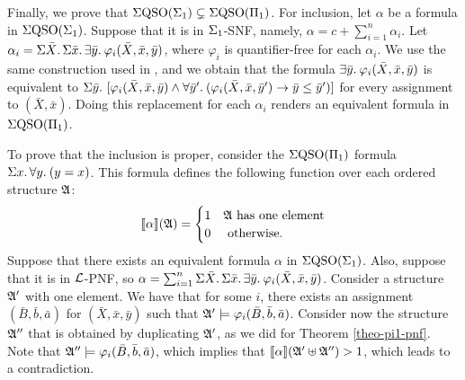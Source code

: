 Finally, we prove that $\Sigma{\rm QSO}(\Sigma_{1})\subsetneq\Sigma{\rm QSO}(\Pi_{1})$. 
For inclusion, let $\alpha$ be a formula in $\Sigma{\rm QSO}(\Sigma_{1})$. 
Suppose that it is in $\Sigma_{1}$-SNF, namely, $\alpha = c + \sum_{i = 1}^{n}\alpha_i$. 
Let $\alpha_i = \Sigma{\bar{X}}.\,\Sigma{\bar{x}}.\,\exists{\bar{y}}.\:\varphi_i(\bar{X},\bar{x},\bar{y})$, where $\varphi_i$ is quantifier-free for each $\alpha_i$. 
We use the same construction used in \cite{SalujaST95}, and we obtain that the formula $\exists{\bar{y}}.\:\varphi_i(\bar{X},\bar{x},\bar{y})$ is equivalent to $\Sigma{\bar{y}}.\,\,[\varphi_i(\bar{X},\bar{x},\bar{y}) \wedge \forall{\bar{y}'}.\:(\varphi_i(\bar{X},\bar{x},\bar{y}')\to\bar{y}\leq\bar{y}')]$ for every assignment to $(\bar{X},\bar{x})$. 
Doing this replacement for each $\alpha_i$ renders an equivalent formula in $\Sigma{\rm QSO}(\Pi_{1})$.

To prove that the inclusion is proper, consider the $\Sigma{\rm QSO}(\Pi_{1})$ formula $\Sigma{x}.\, \forall{y}.\:(y = x)$. 
This formula defines the following function over each ordered structure $\mathfrak{A}$:
$$
{\llbracket{}{\alpha}\rrbracket}(\mathfrak{A}) = 
\begin{cases}
1 &\mathfrak{A} \text{ has one element}\\
0 &\text{ otherwise}.
\end{cases}
$$
Suppose that there exists an equivalent formula $\alpha$ in $\Sigma{\rm QSO}(\Sigma_{1})$. 
Also, suppose that it is in $\mathcal{L}$-PNF, so $\alpha = \sum_{i = 1}^n\Sigma{\bar{X}}.\,\Sigma{\bar{x}}.\,\exists{\bar{y}}.\:\varphi_i(\bar{X},\bar{x},\bar{y})$. 
Consider a structure $\mathfrak{A}'$ with one element. 
We have that for some $i$, there exists an assignment $(\bar{B},\bar{b},\bar{a})$ for $(\bar{X},\bar{x},\bar{y})$ such that $\mathfrak{A}' \models\varphi_i(\bar{B},\bar{b},\bar{a})$. 
Consider now the structure $\mathfrak{A}''$ that is obtained by duplicating $\mathfrak{A}'$, as we did for Theorem \ref{theo-pi1-pnf}. 
Note that $\mathfrak{A}''\models\varphi_i(\bar{B},\bar{b},\bar{a})$, which implies that ${\llbracket{}{\alpha}\rrbracket}(\mathfrak{A}' \uplus \mathfrak{A}'') > 1$, which leads to a contradiction.